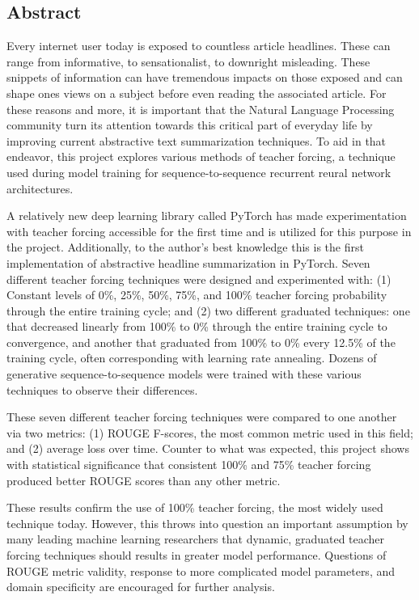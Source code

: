 \begin{onehalfspacing}
\section*{Abstract}
Every internet user today is exposed to countless article headlines. These can range from informative, to sensationalist, to downright misleading. These snippets of information can have tremendous impacts on those exposed and can shape ones views on a subject before even reading the associated article. For these reasons and more, it is important that the Natural Language Processing community turn its attention towards this critical part of everyday life by improving current abstractive text summarization techniques. To aid in that endeavor, this project explores various methods of teacher forcing, a technique used during model training for sequence-to-sequence recurrent reural network architectures.

A relatively new deep learning library called PyTorch has made experimentation with teacher forcing accessible for the first time and is utilized for this purpose in the project. Additionally, to the author's best knowledge this is the first implementation of abstractive headline summarization in PyTorch. Seven different teacher forcing techniques were designed and experimented with: (1) Constant levels of  0\%, 25\%, 50\%, 75\%, and 100\% teacher forcing probability through the entire training cycle; and (2) two different graduated techniques: one that decreased linearly from 100\% to 0\% through the entire training cycle to convergence, and another that graduated from 100\% to 0\% every 12.5\% of the training cycle, often corresponding with learning rate annealing. Dozens of generative sequence-to-sequence models were trained with these various techniques to observe their differences.

These seven different teacher forcing techniques were compared to one another via two metrics: (1) ROUGE F-scores, the most common metric used in this field; and (2) average loss over time. Counter to what was expected, this project shows with statistical significance that consistent 100\% and 75\% teacher forcing produced better ROUGE scores than any other metric.

These results confirm the use of 100\% teacher forcing, the most widely used technique today. However, this throws into question an important assumption by many leading machine learning researchers that dynamic, graduated teacher forcing techniques should results in greater model performance. Questions of ROUGE metric validity, response to more complicated model parameters, and domain specificity are encouraged for further analysis.
\end{onehalfspacing}